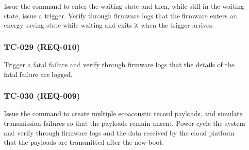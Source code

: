 \documentclass[11pt,a4paper]{article}
\begin{document}
Issue the command to enter the waiting state and then, while still in the
waiting state, issue a trigger. Verify through firmware logs that the firmware
enters an energy-saving state while waiting and exits it when the trigger
arrives.

\subsubsection{TC-029 (REQ-010)}

Trigger a fatal failure and verify through firmware logs that the details of the
fatal failure are logged.

\subsubsection{TC-030 (REQ-009)}

Issue the command to create multiple ecoacoustic record payloads, and simulate
transmission failures so that the payloads remain unsent. Power cycle the system
and verify through firmware logs and the data received by the cloud platform that
the payloads are transmitted after the new boot.
\end{document}
